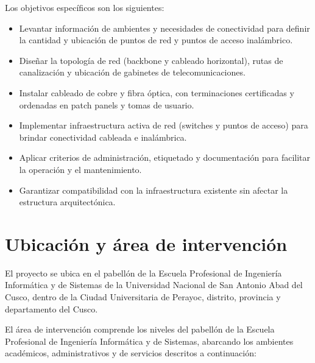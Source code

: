 Los objetivos específicos son los siguientes:

\begin{itemize}
    \item Levantar información de ambientes y necesidades de conectividad para definir la cantidad y ubicación de puntos de red y puntos de acceso inalámbrico.
    \item Diseñar la topología de red (backbone y cableado horizontal), rutas de canalización y ubicación de gabinetes de telecomunicaciones.
    \item Instalar cableado de cobre y fibra óptica, con terminaciones certificadas y ordenadas en patch panels y tomas de usuario.
    \item Implementar infraestructura activa de red (switches y puntos de acceso) para brindar conectividad cableada e inalámbrica.
    \item Aplicar criterios de administración, etiquetado y documentación para facilitar la operación y el mantenimiento.
    \item Garantizar compatibilidad con la infraestructura existente sin afectar la estructura arquitectónica.
\end{itemize}

\section{Ubicación y área de intervención}

El proyecto se ubica en el pabellón de la Escuela Profesional de Ingeniería Informática y de Sistemas de la Universidad Nacional de San Antonio Abad del Cusco, dentro de la Ciudad Universitaria de Perayoc, distrito, provincia y departamento del Cusco.

El área de intervención comprende los \totalPisos{} niveles del pabellón de la Escuela Profesional de Ingeniería Informática y de Sistemas, abarcando los ambientes académicos, administrativos y de servicios descritos a continuación:

